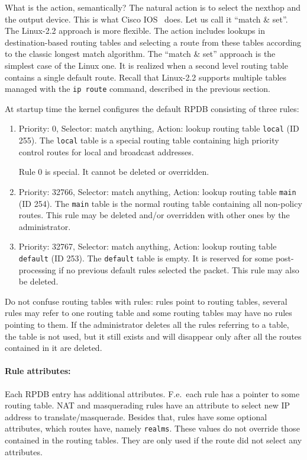 What is the action, semantically? The natural action is to select the
nexthop and the output device. This is what
Cisco IOS~\cite{IOS} does. Let us call it ``match \& set''.
The Linux-2.2 approach is more flexible. The action includes
lookups in destination-based routing tables and selecting
a route from these tables according to the classic longest match algorithm.
The ``match \& set'' approach is the simplest case of the Linux one. It is realized
when a second level routing table contains a single default route.
Recall that Linux-2.2 supports multiple tables
managed with the \verb|ip route| command, described in the previous section.

At startup time the kernel configures the default RPDB consisting of three
rules:

\begin{enumerate}
\item Priority: 0, Selector: match anything, Action: lookup routing
table \verb|local| (ID 255).
The \verb|local| table is a special routing table containing
high priority control routes for local and broadcast addresses.

Rule 0 is special. It cannot be deleted or overridden.


\item Priority: 32766, Selector: match anything, Action: lookup routing
table \verb|main| (ID 254).
The \verb|main| table is the normal routing table containing all non-policy
routes. This rule may be deleted and/or overridden with other
ones by the administrator.

\item Priority: 32767, Selector: match anything, Action: lookup routing
table \verb|default| (ID 253).
The \verb|default| table is empty. It is reserved for some
post-processing if no previous default rules selected the packet.
This rule may also be deleted.

\end{enumerate}

Do not confuse routing tables with rules: rules point to routing tables,
several rules may refer to one routing table and some routing tables
may have no rules pointing to them. If the administrator deletes all the rules
referring to a table, the table is not used, but it still exists
and will disappear only after all the routes contained in it are deleted.


\paragraph{Rule attributes:} Each RPDB entry has additional
attributes. F.e.\ each rule has a pointer to some routing
table. NAT and masquerading rules have an attribute to select new IP
address to translate/masquerade. Besides that, rules have some
optional attributes, which routes have, namely \verb|realms|.
These values do not override those contained in the routing tables. They
are only used if the route did not select any attributes.


